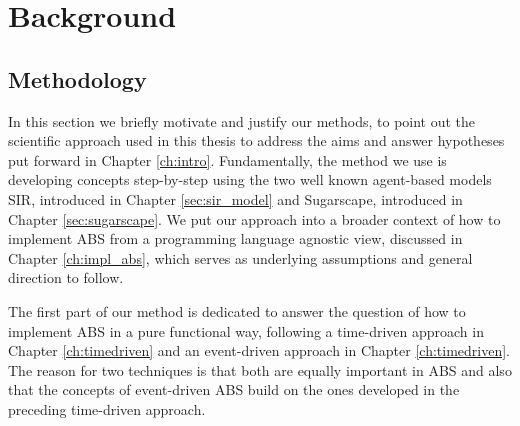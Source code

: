 \chapter{Background}
\label{ch:background}







\section{Methodology}

In this section we briefly motivate and justify our methods, to point out the scientific approach used in this thesis to address the aims and answer hypotheses put forward in Chapter \ref{ch:intro}. Fundamentally, the method we use is developing concepts step-by-step using the two well known agent-based models SIR, introduced in Chapter \ref{sec:sir_model} and Sugarscape, introduced in Chapter \ref{sec:sugarscape}. We put our approach into a broader context of how to implement ABS from a programming language agnostic view, discussed in Chapter \ref{ch:impl_abs}, which serves as underlying assumptions and general direction to follow.

The first part of our method is dedicated to answer the question of how to implement ABS in a pure functional way, following a time-driven approach in Chapter \ref{ch:timedriven} and an event-driven approach in Chapter \ref{ch:timedriven}. The reason for two techniques is that both are equally important in ABS and also that the concepts of event-driven ABS build on the ones developed in the preceding time-driven approach.

